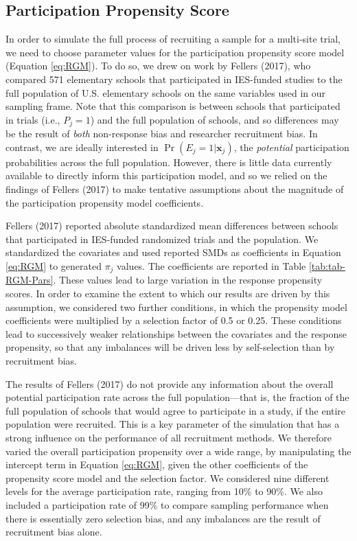\documentclass[
  man,floatsintext]{apa6}
\begin{document}
\hypertarget{participation-propensity-score}{%
\subsection*{Participation Propensity Score}\label{participation-propensity-score}}

In order to simulate the full process of recruiting a sample for a multi-site trial, we need to choose parameter values for the participation propensity score model (Equation \eqref{eq:RGM}).
To do so, we drew on work by Fellers (2017), who compared 571 elementary schools that participated in IES-funded studies to the full population of U.S. elementary schools on the same variables used in our sampling frame.
Note that this comparison is between schools that participated in trials (i.e., \(P_j = 1\)) and the full population of schools, and so differences may be the result of \emph{both} non-response bias and researcher recruitment bias.
In contrast, we are ideally interested in \(\Pr(E_j = 1 | \mathbf{x}_j)\), the \emph{potential} participation probabilities across the full population.
However, there is little data currently available to directly inform this participation model, and so we relied on the findings of Fellers (2017) to make tentative assumptions about the magnitude of the participation propensity model coefficients.

Fellers (2017) reported absolute standardized mean differences between schools that participated in IES-funded randomized trials and the population. We standardized the covariates and used reported SMDs as coefficients in Equation \eqref{eq:RGM} to generated \(\pi_j\) values. The coefficients are reported in Table \ref{tab:tab-RGM-Pars}.
These values lead to large variation in the response propensity scores. In order to examine the extent to which our results are driven by this assumption, we considered two further conditions, in which the propensity model coefficients were multiplied by a selection factor of 0.5 or 0.25.
These conditions lead to successively weaker relationships between the covariates and the response propensity, so that any imbalances will be driven less by self-selection than by recruitment bias.

The results of Fellers (2017) do not provide any information about the overall potential participation rate across the full population---that is, the fraction of the full population of schools that would agree to participate in a study, if the entire population were recruited. This is a key parameter of the simulation that has a strong influence on the performance of all recruitment methods. We therefore varied the overall participation propensity over a wide range, by manipulating the intercept term in Equation \eqref{eq:RGM}, given the other coefficients of the propensity score model and the selection factor. We considered nine different levels for the average participation rate, ranging from 10\% to 90\%. We also included a participation rate of 99\% to compare sampling performance when there is essentially zero selection bias, and any imbalances are the result of recruitment bias alone.
\end{document}
